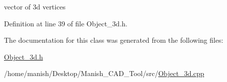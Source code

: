 vector of 3d vertices 



Definition at line 39 of file Object\+\_\+3d.\+h.



The documentation for this class was generated from the following files\+:\begin{DoxyCompactItemize}
\item 
\hyperlink{_object__3d_8h}{Object\+\_\+3d.\+h}\item 
/home/manish/\+Desktop/\+Manish\+\_\+\+C\+A\+D\+\_\+\+Tool/src/\hyperlink{_object__3d_8cpp}{Object\+\_\+3d.\+cpp}\end{DoxyCompactItemize}

